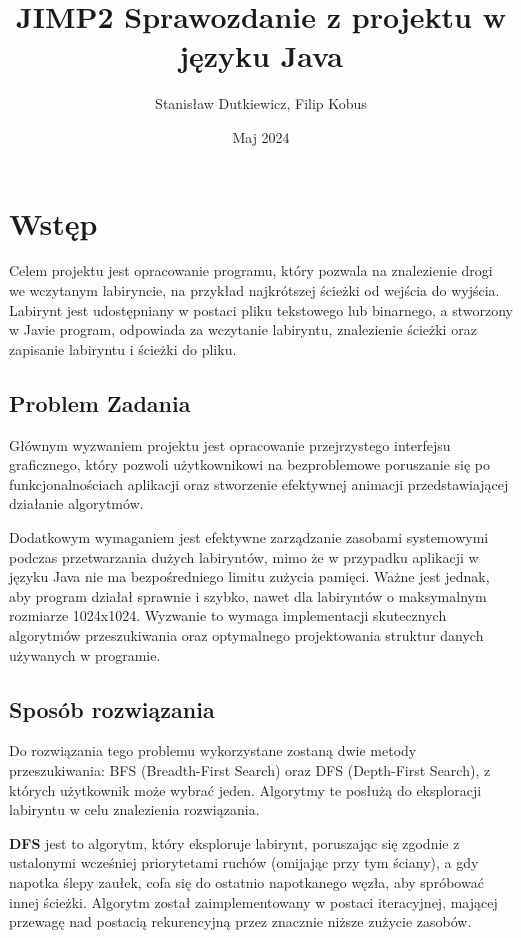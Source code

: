 \documentclass{article}
\title{JIMP2 Sprawozdanie z projektu w języku Java}
\author{Stanisław Dutkiewicz, Filip Kobus}
\date{Maj 2024}
\begin{document}
\maketitle

\newpage
\tableofcontents

\newpage

\section{Wstęp}
Celem projektu jest opracowanie programu, który pozwala na znalezienie drogi we wczytanym labiryncie, na przykład najkrótszej ścieżki od wejścia do wyjścia. Labirynt jest udostępniany w postaci pliku tekstowego lub binarnego, a stworzony w Javie program, odpowiada za wczytanie labiryntu, znalezienie ścieżki oraz zapisanie labiryntu i ścieżki do pliku.

\subsection{Problem Zadania}

Głównym wyzwaniem projektu jest opracowanie przejrzystego interfejsu graficznego, który pozwoli użytkownikowi na bezproblemowe poruszanie się po funkcjonalnościach aplikacji oraz stworzenie efektywnej animacji przedstawiającej działanie algorytmów.

Dodatkowym wymaganiem jest efektywne zarządzanie zasobami systemowymi podczas przetwarzania dużych labiryntów, mimo że w przypadku aplikacji w języku Java nie ma bezpośredniego limitu zużycia pamięci. Ważne jest jednak, aby program działał sprawnie i szybko, nawet dla labiryntów o maksymalnym rozmiarze 1024x1024. Wyzwanie to wymaga implementacji skutecznych algorytmów przeszukiwania oraz optymalnego projektowania struktur danych używanych w programie.

\subsection{Sposób rozwiązania}

Do rozwiązania tego problemu wykorzystane zostaną dwie metody przeszukiwania: BFS (Breadth-First Search) oraz DFS (Depth-First Search), z których użytkownik może wybrać jeden. Algorytmy te posłużą do eksploracji labiryntu w celu znalezienia rozwiązania.


\vspace{1mm}

\item \textbf{DFS} jest to algorytm, który eksploruje labirynt, poruszając się zgodnie z ustalonymi wcześniej priorytetami ruchów (omijając przy tym ściany), a gdy napotka ślepy zaułek, cofa się do ostatnio napotkanego węzła, aby spróbować innej ścieżki. Algorytm został zaimplementowany w postaci iteracyjnej, mającej przewagę nad postacią rekurencyjną przez znacznie niższe zużycie zasobów.
\end{document}
